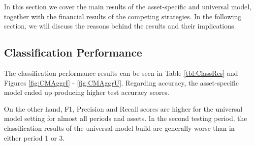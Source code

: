 \documentclass[11pt, a4paper]{article}
\begin{document}
In this section we cover the main results of the asset-specific and universal model, together with the financial results of the competing strategies. In the following section, we will discuss the reasons behind the results and their implications.

\subsection{Classification Performance}
\label{subsec:ER:ClassPerf}

The classification performance results can be seen in Table \ref{tbl:ClassRes} and Figures \ref{fig:CMAggrI} - \ref{fig:CMAggrU}.
Regarding accuracy, the asset-specific model ended up producing higher test accuracy scores. 

On the other hand, F1, Precision and Recall scores are higher for the universal model setting for almost all periods and assets. In the second testing period, the classification results of the universal model build are generally worse than in either period 1 or 3.
\end{document}
